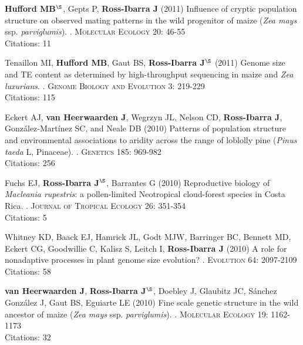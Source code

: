 \documentclass[letterpaper,10pt]{article}
\begin{document}
\begin{etaremune}
\item {\bf Hufford MB}$^\S$, Gepts P, {\bf Ross-Ibarra J} (2011) Influence of cryptic population structure on observed mating patterns in the wild progenitor of maize (\emph{Zea mays} ssp. \emph{parviglumis}). . \textsc{Molecular Ecology} 20: 46-55
\\Citations: 11\\


\item Tenaillon MI, {\bf Hufford MB}, Gaut BS, {\bf Ross-Ibarra J}$^\S$ (2011)  Genome size and TE content as determined by high-throughput sequencing in maize and \emph{Zea luxurians}. . \textsc{Genome Biology and Evolution } 3: 219-229
\\Citations: 115\\


\item Eckert AJ, {\bf van Heerwaarden J}, Wegrzyn JL, Nelson CD, {\bf Ross-Ibarra J}, Gonz\'{a}lez-Mart\'{i}nez SC, and Neale DB (2010) Patterns of population structure and environmental associations to aridity across the range of loblolly pine (\emph{Pinus taeda} L, Pinaceae). . \textsc{Genetics} 185: 969-982
\\Citations: 256\\


\item Fuchs EJ, {\bf Ross-Ibarra J}$^\S$, Barrantes G (2010) Reproductive biology of \emph{Macleania rupestris}: a pollen-limited Neotropical cloud-forest species in Costa Rica. . \textsc{Journal of Tropical Ecology} 26: 351-354
\\Citations: 5\\


\item Whitney KD, Baack EJ, Hamrick JL, Godt MJW, Barringer BC, Bennett MD, Eckert CG, Goodwillie C, Kalisz S, Leitch I, {\bf Ross-Ibarra J} (2010) A role for nonadaptive processes in plant genome size evolution? . \textsc{Evolution} 64: 2097-2109
\\Citations: 58\\


\item {\bf van Heerwaarden J}, {\bf Ross-Ibarra J}$^\S$, Doebley J, Glaubitz JC, S\'{a}nchez Gonz\'{a}lez J, Gaut BS, Eguiarte LE (2010) Fine scale genetic structure in the wild ancestor of maize (\emph{Zea mays} ssp. \emph{parviglumis}). . \textsc{Molecular Ecology} 19: 1162-1173
\\Citations: 32\\



\end{etaremune}
\end{document}
